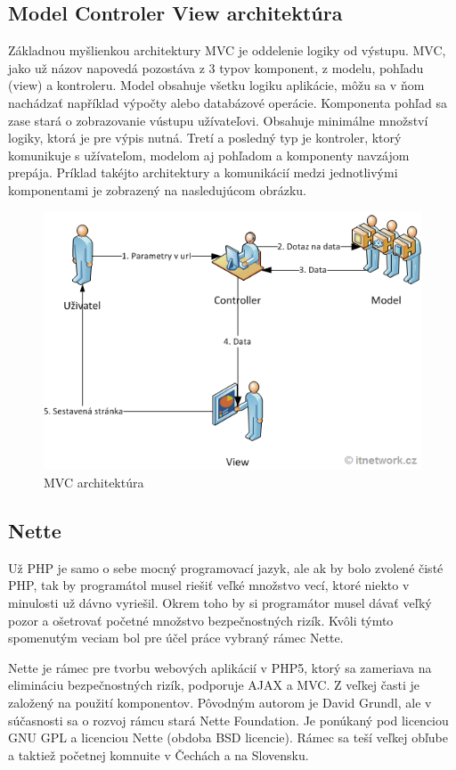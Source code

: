 \subsection{Model Controler View architektúra}
Základnou myšlienkou architektury MVC je oddelenie 	logiky od výstupu. MVC, jako už názov napovedá pozostáva z 3 typov komponent, z modelu, pohľadu (view) a kontroleru. Model obsahuje všetku logiku aplikácie, môžu sa v ňom nachádzať například výpočty alebo databázové operácie. Komponenta pohľad sa zase stará o zobrazovanie vústupu užívateľovi. Obsahuje minimálne množství logiky, ktorá je pre výpis nutná. Tretí a posledný typ je kontroler, ktorý komunikuje s užívateľom, modelom aj pohľadom a komponenty navzájom prepája. Príklad takéjto architektury a komunikácií medzi jednotlivými komponentami je zobrazený na nasledujúcom obrázku.
\begin{figure}[htp]
\centering
\includegraphics[scale=0.7]{fig/mvc.png}
\caption{MVC architektúra}
\label{fig:mvc}
\end{figure}

\subsection{Nette}
Už PHP je samo o sebe mocný programovací jazyk, ale ak by bolo zvolené čisté PHP, tak by programátol musel riešiť veľké množstvo vecí, ktoré niekto v minulosti už dávno vyriešil. Okrem toho by si programátor musel dávať veľký pozor a ošetrovať početné množstvo bezpečnostných rizík. Kvôli týmto spomenutým veciam bol pre účel práce vybraný rámec Nette.

Nette je rámec pre tvorbu webových aplikácií v PHP5, ktorý sa zameriava na elimináciu bezpečnostných rizík, podporuje AJAX a MVC. Z veľkej časti je založený na použití komponentov. Pôvodným autorom je David Grundl, ale v súčasnosti sa o rozvoj rámcu stará Nette Foundation. Je ponúkaný pod licenciou GNU GPL a licenciou Nette (obdoba BSD licencie). Rámec sa teší veľkej obľube a taktiež početnej komnuite v Čechách a na Slovensku.


